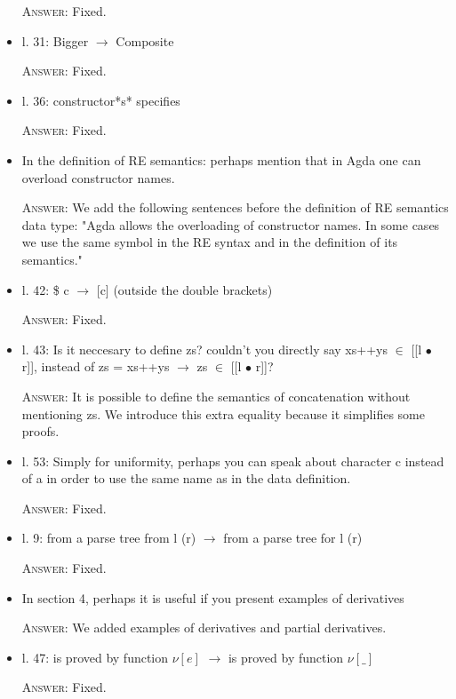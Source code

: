 \documentclass{article}
\begin{document}
\begin{itemize}
    \textsc{Answer}: Fixed.

    \item l. 31: Bigger $\to$ Composite

    \textsc{Answer}: Fixed.

    \item l. 36: constructor*s* specifies

    \textsc{Answer}: Fixed.

    \item In the definition of RE semantics:
    perhaps  mention that in Agda one can overload constructor names. 

    \textsc{Answer}: We add the following sentences before the definition of RE semantics data type:
    "Agda allows the overloading of constructor names. In some cases we use the same symbol in 
    the RE syntax and in the definition of its semantics."

    \item l. 42: \$ c $\to$ [c] (outside the double brackets)

    \textsc{Answer}: Fixed.

    \item l. 43: Is it neccesary to define zs? couldn't you directly say xs++ys $\in$ [[l $\bullet$ r]], instead of zs = xs++ys $\to$ zs $\in$ [[l $\bullet$ r]]?

    \textsc{Answer}: It is possible to define the semantics of concatenation without mentioning zs. We introduce this extra equality because it simplifies
    some proofs.  

    \item l. 53: Simply for uniformity, perhaps you can speak about character c instead of a in order to use the same name as in the data definition.

    \textsc{Answer}: Fixed.

    \item l. 9: from a parse tree from l (r) $\to$ from a parse tree for l (r)

    \textsc{Answer}: Fixed.

    \item In section 4, perhaps it is useful if you present examples of derivatives

    \textsc{Answer}: We added examples of derivatives and partial derivatives.

    \item l. 47: is proved by function $\nu[e]$ $\to$ is proved by function $\nu[\_]$

    \textsc{Answer}: Fixed.


\end{itemize}
\end{document}
